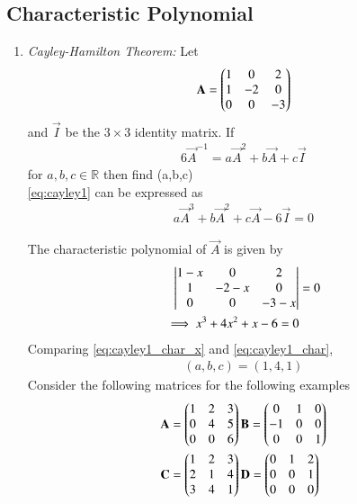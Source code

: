 \subsection{Characteristic Polynomial}
\renewcommand{\theequation}{\theenumi}
\renewcommand{\thefigure}{\theenumi}
\begin{enumerate}[label=\thesubsection.\arabic*.,ref=\thesubsection.\theenumi]

\item {\em Cayley-Hamilton Theorem: }Let
\begin{align}
\mathbf{A}=\begin{pmatrix}1&0&2\\1&-2&0\\0&0&-3\end{pmatrix}
\end{align}
and $\vec{I}$ be the $3\times3$ identity matrix. If 
\begin{align}
6\vec{A}^{-1}=a\vec{A}^2+b\vec{A}+c\vec{I} \label{eq:cayley1}
\end{align} for $a,b,c \in \mathbb{R}$ then find (a,b,c)
\\
\solution \eqref{eq:cayley1} can be expressed as
\begin{align}
a\vec{A}^3+b\vec{A}^2+c\vec{A} 
-6\vec{I} = 0
\label{eq:cayley1_char}
\end{align} 

The characteristic polynomial of $\vec{A}$ is given by 
\begin{align}
\begin{vmatrix}1-x&0&2\\1&-2-x&0\\0&0&-3-x\end{vmatrix} &=0
\\
\implies x^3 + 4x^2 + x - 6 = 0
\label{eq:cayley1_char_x}
\end{align}
Comparing \eqref{eq:cayley1_char_x} and \eqref{eq:cayley1_char},
\begin{align}
(a,b,c) = (1,4,1)
\end{align}
Consider the following matrices for the following examples
\begin{align}
\mathbf{A} &=  \begin{pmatrix}1&2&3\\0&4&5\\0&0&6\end{pmatrix}
\mathbf{B} =  \begin{pmatrix}0&1&0\\-1&0&0\\0&0&1\end{pmatrix}
\\
\mathbf{C} &=      \begin{pmatrix}1&2&3\\2&1&4\\3&4&1\end{pmatrix}
\mathbf{D} =      \begin{pmatrix}0&1&2\\0&0&1\\0&0&0\end{pmatrix}
\end{align}


\end{enumerate}
